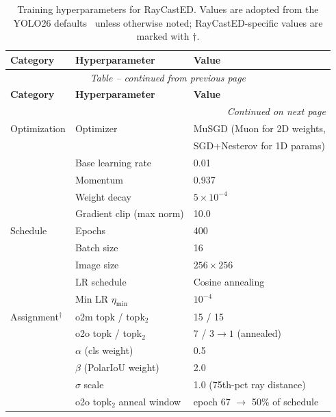 \renewcommand{\arraystretch}{1.15}
\begin{longtable}{l l l}
	\caption{Training hyperparameters for RayCastED. Values are adopted from the YOLO26 defaults~\cite{sapkota2025yolo26} unless otherwise noted; RayCastED-specific values are marked with $\dagger$.}
	\label{tab:hyperparameters} \\
	\hline
	\textbf{Category} & \textbf{Hyperparameter} & \textbf{Value} \\
	\hline
	\endfirsthead
	\multicolumn{3}{c}{\textit{Table \thetable{} -- continued from previous page}} \\
	\hline
	\textbf{Category} & \textbf{Hyperparameter} & \textbf{Value} \\
	\hline
	\endhead
	\hline
	\multicolumn{3}{r}{\textit{Continued on next page}} \\
	\endfoot
	\hline
	\endlastfoot
	Optimization  & Optimizer              & MuSGD (Muon for 2D weights, \\
	               &                        & SGD+Nesterov for 1D params) \\
	               & Base learning rate     & 0.01 \\
	               & Momentum               & 0.937 \\
	               & Weight decay           & $5 \times 10^{-4}$ \\
	               & Gradient clip (max norm) & 10.0 \\
	\hline
	Schedule      & Epochs                 & 400 \\
	               & Batch size             & 16 \\
	               & Image size             & $256 \times 256$ \\
	               & LR schedule            & Cosine annealing \\
	               & Min LR $\eta_{\min}$   & $10^{-4}$ \\
	\hline
	Assignment$^\dagger$ & o2m topk / topk$_2$ & 15 / 15 \\
	               & o2o topk / topk$_2$    & 7 / $3 \to 1$ (annealed) \\
	               & $\alpha$ (cls weight)  & 0.5 \\
	               & $\beta$ (PolarIoU weight) & 2.0 \\
	               & $\sigma$ scale         & 1.0 (75th-pct ray distance) \\
	               & o2o topk$_2$ anneal window & epoch 67 $\to$ 50\% of schedule \\

\end{longtable}
